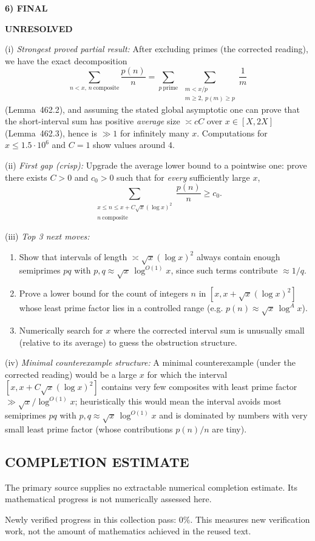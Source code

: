 \noindent\textbf{6) FINAL}

\textbf{UNRESOLVED}

(i) \emph{Strongest proved partial result:} After excluding primes (the corrected reading), we have the exact decomposition
\[\sum_{n<x,\,n\ \mathrm{composite}}\frac{p(n)}{n}=\sum_{p\ \mathrm{prime}}\ \sum_{\substack{m<x/p\\ m\ge 2,\ p(m)\ge p}} \frac1m\]
(Lemma~462.2), and assuming the stated global asymptotic one can prove that the short-interval sum has positive \emph{average} size $\asymp cC$ over $x\in[X,2X]$ (Lemma~462.3), hence is $\gg 1$ for infinitely many $x$. Computations for $x\le 1.5\cdot 10^6$ and $C=1$ show values around $4$.

(ii) \emph{First gap (crisp):} Upgrade the average lower bound to a pointwise one: prove there exists $C>0$ and $c_0>0$ such that for \emph{every} sufficiently large $x$,
\[\sum_{\substack{x\le n\le x+C\sqrt{x}(\log x)^2\\ n\ \mathrm{composite}}}\frac{p(n)}{n}\ge c_0.
\]

(iii) \emph{Top 3 next moves:}
\begin{enumerate}
\item Show that intervals of length $\asymp \sqrt{x}(\log x)^2$ always contain enough semiprimes $pq$ with $p,q\approx \sqrt{x}\,\log^{O(1)}x$, since such terms contribute $\approx 1/q$.
\item Prove a lower bound for the count of integers $n$ in $[x,x+\sqrt{x}(\log x)^2]$ whose least prime factor lies in a controlled range (e.g. $p(n)\approx \sqrt{x}\,\log^A x$).
\item Numerically search for $x$ where the corrected interval sum is unusually small (relative to its average) to guess the obstruction structure.
\end{enumerate}

(iv) \emph{Minimal counterexample structure:} A minimal counterexample (under the corrected reading) would be a large $x$ for which the interval $[x,x+C\sqrt{x}(\log x)^2]$ contains very few composites with least prime factor $\gg \sqrt{x}/\log^{O(1)}x$; heuristically this would mean the interval avoids most semiprimes $pq$ with $p,q\approx \sqrt{x}\,\log^{O(1)}x$ and is dominated by numbers with very small least prime factor (whose contributions $p(n)/n$ are tiny).


\subsection*{COMPLETION ESTIMATE}
The primary source supplies no extractable numerical completion estimate. Its mathematical progress is not numerically assessed here.

Newly verified progress in this collection pass: $0\%$. This measures new verification work, not the amount of mathematics achieved in the reused text.
